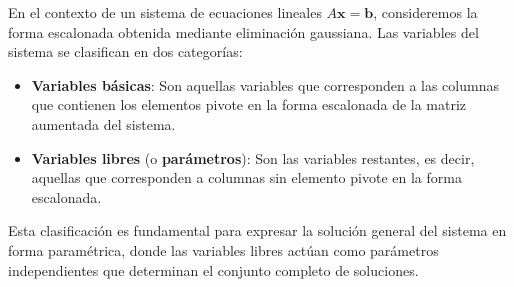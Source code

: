 \begin{definition}
En el contexto de un sistema de ecuaciones lineales $A\mathbf{x}=\mathbf{b}$, consideremos la forma escalonada obtenida mediante eliminación gaussiana. Las variables del sistema se clasifican en dos categorías:

\begin{itemize}
\item \textbf{Variables básicas}: Son aquellas variables que corresponden a las columnas que contienen los elementos pivote en la forma escalonada de la matriz aumentada del sistema.

\item \textbf{Variables libres} (o \textbf{parámetros}): Son las variables restantes, es decir, aquellas que corresponden a columnas sin elemento pivote en la forma escalonada.
\end{itemize}

Esta clasificación es fundamental para expresar la solución general del sistema en forma paramétrica, donde las variables libres actúan como parámetros independientes que determinan el conjunto completo de soluciones.
\end{definition}

